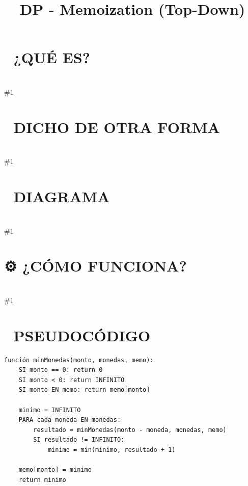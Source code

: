 \documentclass{article}
\newcommand{\quees}[1]{\section*{🤔 ¿QUÉ ES?}\hrulefill \\ \#1}
\newcommand{\dichodeotraforma}[1]{\section*{💬 DICHO DE OTRA FORMA}\hrulefill \\ \#1}
\newcommand{\diagrama}[1]{\section*{🎨 DIAGRAMA}\hrulefill \\ \#1}
\newcommand{\comofunciona}[1]{\section*{⚙️ ¿CÓMO FUNCIONA?}\hrulefill \\ \#1}
\begin{document}
\title{DP - Memoization (Top-Down)}
\date{}
\maketitle
\quees{Un chef que anota recetas nuevas en un cuaderno 📖. 

Imagina que estás cocinando platillos complejos. La primera vez que
haces una salsa secreta, tardas mucho tiempo y esfuerzo. En lugar de
olvidar cómo la hiciste, anotas los pasos y el resultado en tu 
cuaderno.

La siguiente vez que alguien pide ese platillo, no vuelves a 
experimentar; simplemente abres tu cuaderno, lees la receta y 
¡listo! Tienes el resultado al instante. 

En programación, Memoization es el cuaderno donde guardas el resultado
de una función para ciertos argumentos, para no tener que volver a 
ejecutar toda la lógica si te vuelven a pedir lo mismo.}
\dichodeotraforma{Memoization es la técnica de DP basada en Recursión (Top-Down). 

Empiezas con el problema original (el más grande) y lo vas rompiendo 
en partes pequeñas. Antes de regresar el valor de una función, lo
guardas en una estructura de datos (generalmente un Array o un Hash Map)
donde la Key son los argumentos de la función.

Es muy natural de implementar si ya tienes una solución recursiva,
ya que solo requiere agregar el paso de "Revisar cuaderno" y 
"Anotar en cuaderno".}
\diagrama{\begin{verbatim}
Llamada: f(5)

1. ¿f(5) está en el cuaderno?
   - SÍ: Regresa el valor guardado. O(1) ⚡
   - NO:
     a. Calcula f(5) haciendo f(4) + f(3).
     b. Guarda el resultado: cuaderno[5] = resultado.
     c. Regresa el resultado.

¡Esto convierte un árbol de recursión gigante en un camino lineal!
\end{verbatim}}
\comofunciona{Para cualquier función recursiva:
1. Pasa una estructura `memo` como parámetro (o úsala global).
2. CASO BASE: Define cuándo detener la recursión.
3. REVISAR MEMO: Si el resultado ya está calculado, regrésalo.
4. CALCULAR Y GUARDAR: Calcula el valor, guárdalo en `memo` y regrésalo.}
\section*{📝 PSEUDOCÓDIGO}
\hrulefill
\begin{verbatim}
función minMonedas(monto, monedas, memo):
    SI monto == 0: return 0
    SI monto < 0: return INFINITO
    SI monto EN memo: return memo[monto]

    minimo = INFINITO
    PARA cada moneda EN monedas:
        resultado = minMonedas(monto - moneda, monedas, memo)
        SI resultado != INFINITO:
            minimo = min(minimo, resultado + 1)

    memo[monto] = minimo
    return minimo
\end{verbatim}
\end{document}
